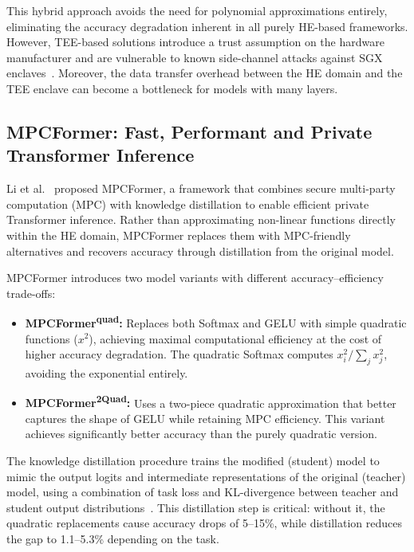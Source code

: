 This hybrid approach avoids the need for polynomial approximations entirely, eliminating the accuracy degradation inherent in all purely HE-based frameworks. However, TEE-based solutions introduce a trust assumption on the hardware manufacturer and are vulnerable to known side-channel attacks against SGX enclaves~\cite{li2024thef}. Moreover, the data transfer overhead between the HE domain and the TEE enclave can become a bottleneck for models with many layers.

\subsection{MPCFormer: Fast, Performant and Private Transformer Inference}
\label{sec:mpcformer}

Li et al.~\cite{li2023mpcformer} proposed MPCFormer, a framework that combines secure multi-party computation (MPC) with knowledge distillation to enable efficient private Transformer inference. Rather than approximating non-linear functions directly within the HE domain, MPCFormer replaces them with MPC-friendly alternatives and recovers accuracy through distillation from the original model.

MPCFormer introduces two model variants with different accuracy--efficiency trade-offs:

\begin{itemize}
    \item \textbf{MPCFormer\textsuperscript{quad}:} Replaces both Softmax and GELU with simple quadratic functions ($x^2$), achieving maximal computational efficiency at the cost of higher accuracy degradation. The quadratic Softmax computes $x_i^2 / \sum_j x_j^2$, avoiding the exponential entirely.
    \item \textbf{MPCFormer\textsuperscript{2Quad}:} Uses a two-piece quadratic approximation that better captures the shape of GELU while retaining MPC efficiency. This variant achieves significantly better accuracy than the purely quadratic version.
\end{itemize}

The knowledge distillation procedure trains the modified (student) model to mimic the output logits and intermediate representations of the original (teacher) model, using a combination of task loss and KL-divergence between teacher and student output distributions~\cite{hinton2015distilling}. This distillation step is critical: without it, the quadratic replacements cause accuracy drops of 5--15\%, while distillation reduces the gap to 1.1--5.3\% depending on the task.

